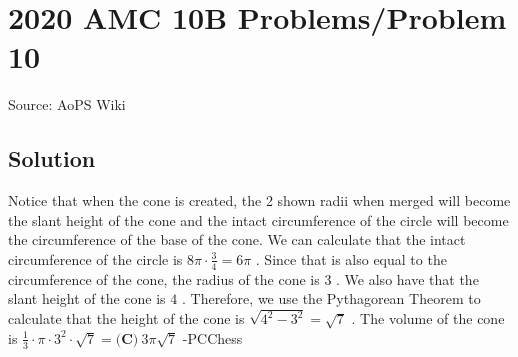 \documentclass[12pt]{article}
\begin{document}
\section*{{2020 AMC 10B Problems/Problem 10}}
Source: AoPS Wiki

\subsection*{Solution}
Notice that when the cone is created, the 2 shown radii when merged will become the slant height of the cone and the intact circumference of the circle will become the circumference of the base of the cone. We can calculate that the intact circumference of the circle is $8\pi\cdot\frac{3}{4}=6\pi$ . Since that is also equal to the circumference of the cone, the radius of the cone is $3$ . We also have that the slant height of the cone is $4$ . Therefore, we use the Pythagorean Theorem to calculate that the height of the cone is $\sqrt{4^2-3^2}=\sqrt7$ . The volume of the cone is $\frac{1}{3}\cdot\pi\cdot3^2\cdot\sqrt7=\boxed{\textbf{(C)}\ 3 \pi \sqrt7 }$ -PCChess
\end{document}
